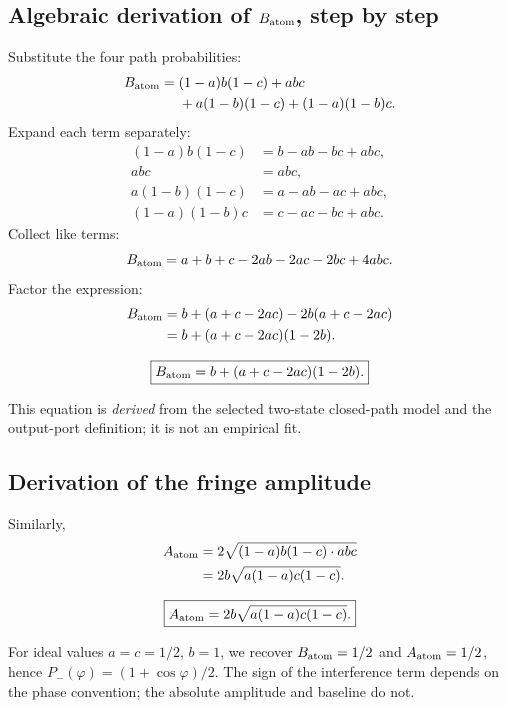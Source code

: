 \documentclass[11pt,a4paper]{article}
\numberwithin{equation}{section}
\begin{document}
\subsection{Algebraic derivation of $B_{\rm atom}$, step by step}

Substitute the four path probabilities:
\begin{align}
B_{\rm atom}={}&(1-a)b(1-c)+abc\\
&+a(1-b)(1-c)+(1-a)(1-b)c.
\end{align}
Expand each term separately:
\begin{align*}
(1-a)b(1-c)&=b-ab-bc+abc,\\
abc&=abc,\\
a(1-b)(1-c)&=a-ab-ac+abc,\\
(1-a)(1-b)c&=c-ac-bc+abc.
\end{align*}
Collect like terms:
\begin{equation}
 B_{\rm atom}=a+b+c-2ab-2ac-2bc+4abc.
\end{equation}
Factor the expression:
\begin{align}
 B_{\rm atom}
 &=b+(a+c-2ac)-2b(a+c-2ac)\\
 &=b+(a+c-2ac)(1-2b).
\end{align}
\begin{keybox}
\begin{equation}\label{eq:bfinal}
\boxed{B_{\rm atom}=b+(a+c-2ac)(1-2b).}
\end{equation}
\end{keybox}
This equation is \emph{derived} from the selected two-state closed-path
model and the output-port definition; it is not an empirical fit.

\subsection{Derivation of the fringe amplitude}

Similarly,
\begin{align}
A_{\rm atom}
 &=2\sqrt{(1-a)b(1-c)\cdot abc}\\
 &=2b\sqrt{a(1-a)c(1-c)}.
\end{align}
\begin{keybox}
\begin{equation}\label{eq:afinal}
\boxed{A_{\rm atom}=2b\sqrt{a(1-a)c(1-c)}.}
\end{equation}
\end{keybox}
For ideal values $a=c=1/2$, $b=1$, we recover $B_{\rm atom}=1/2$
and $A_{\rm atom}=1/2$, hence $P_-(\varphi)=(1+\cos\varphi)/2$.
The sign of the interference term depends on the phase convention; the
absolute amplitude and baseline do not.
\end{document}
